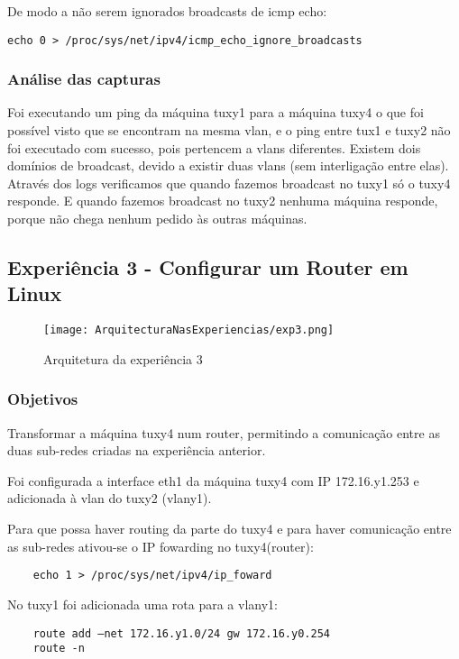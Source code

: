 \documentclass[a4paper]{article}
\begin{document}
De modo a não serem ignorados broadcasts de icmp echo:
\begin{verbatim}
echo 0 > /proc/sys/net/ipv4/icmp_echo_ignore_broadcasts
\end{verbatim}

\subsubsection{Análise das capturas}
Foi executando um ping da máquina tuxy1 para a máquina tuxy4 o que foi possível visto que se encontram na mesma vlan, e o ping entre tux1 e tuxy2 não foi executado com sucesso, pois pertencem a vlans diferentes.
Existem dois domínios de broadcast, devido a existir duas vlans (sem interligação entre elas).
Através dos logs verificamos que quando fazemos broadcast no tuxy1 só o tuxy4 responde. E quando
fazemos broadcast no tuxy2 nenhuma máquina responde, porque não chega nenhum pedido às
outras máquinas.

\subsection{Experiência 3 - Configurar um Router em Linux}

\begin{figure}[h]
    \centering
    \texttt{[image: ArquitecturaNasExperiencias/exp3.png]}
    \caption{Arquitetura da experiência 3}
\end{figure}

\subsubsection{Objetivos}
Transformar a máquina tuxy4 num router, permitindo a comunicação entre as duas sub-redes criadas na experiência anterior.

Foi configurada a interface eth1 da máquina tuxy4 com IP 172.16.y1.253 e adicionada à vlan do tuxy2 (vlany1).

Para que possa haver routing da parte do tuxy4 e para haver comunicação entre as sub-redes ativou-se o IP fowarding no tuxy4(router):
\begin{verbatim}
	echo 1 > /proc/sys/net/ipv4/ip_foward
\end{verbatim}

No tuxy1 foi adicionada uma rota para a vlany1:
\begin{verbatim}
	route add –net 172.16.y1.0/24 gw 172.16.y0.254
	route -n
\end{verbatim}
\end{document}
